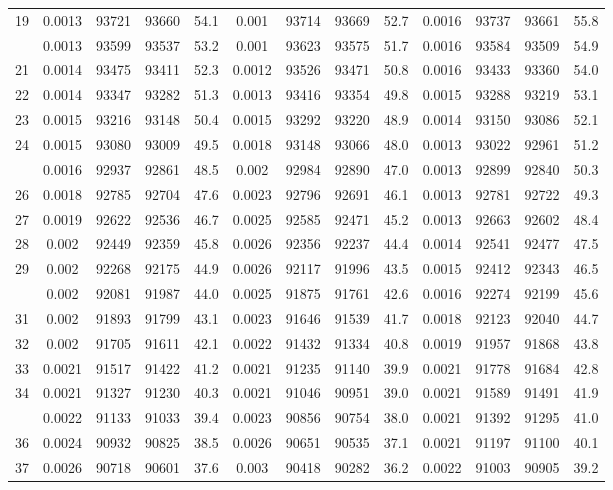 \documentclass[
  14pt,
]{article}
\begin{document}
\begin{longtable}[t]{lcccccccccccc}
19 & 0.0013 & 93721 & 93660 & 54.1 & 0.001 & 93714 & 93669 & 52.7 & 0.0016 & 93737 & 93661 & 55.8\\
\addlinespace
20 & 0.0013 & 93599 & 93537 & 53.2 & 0.001 & 93623 & 93575 & 51.7 & 0.0016 & 93584 & 93509 & 54.9\\
21 & 0.0014 & 93475 & 93411 & 52.3 & 0.0012 & 93526 & 93471 & 50.8 & 0.0016 & 93433 & 93360 & 54.0\\
22 & 0.0014 & 93347 & 93282 & 51.3 & 0.0013 & 93416 & 93354 & 49.8 & 0.0015 & 93288 & 93219 & 53.1\\
23 & 0.0015 & 93216 & 93148 & 50.4 & 0.0015 & 93292 & 93220 & 48.9 & 0.0014 & 93150 & 93086 & 52.1\\
24 & 0.0015 & 93080 & 93009 & 49.5 & 0.0018 & 93148 & 93066 & 48.0 & 0.0013 & 93022 & 92961 & 51.2\\
\addlinespace
25 & 0.0016 & 92937 & 92861 & 48.5 & 0.002 & 92984 & 92890 & 47.0 & 0.0013 & 92899 & 92840 & 50.3\\
26 & 0.0018 & 92785 & 92704 & 47.6 & 0.0023 & 92796 & 92691 & 46.1 & 0.0013 & 92781 & 92722 & 49.3\\
27 & 0.0019 & 92622 & 92536 & 46.7 & 0.0025 & 92585 & 92471 & 45.2 & 0.0013 & 92663 & 92602 & 48.4\\
28 & 0.002 & 92449 & 92359 & 45.8 & 0.0026 & 92356 & 92237 & 44.4 & 0.0014 & 92541 & 92477 & 47.5\\
29 & 0.002 & 92268 & 92175 & 44.9 & 0.0026 & 92117 & 91996 & 43.5 & 0.0015 & 92412 & 92343 & 46.5\\
\addlinespace
30 & 0.002 & 92081 & 91987 & 44.0 & 0.0025 & 91875 & 91761 & 42.6 & 0.0016 & 92274 & 92199 & 45.6\\
31 & 0.002 & 91893 & 91799 & 43.1 & 0.0023 & 91646 & 91539 & 41.7 & 0.0018 & 92123 & 92040 & 44.7\\
32 & 0.002 & 91705 & 91611 & 42.1 & 0.0022 & 91432 & 91334 & 40.8 & 0.0019 & 91957 & 91868 & 43.8\\
33 & 0.0021 & 91517 & 91422 & 41.2 & 0.0021 & 91235 & 91140 & 39.9 & 0.0021 & 91778 & 91684 & 42.8\\
34 & 0.0021 & 91327 & 91230 & 40.3 & 0.0021 & 91046 & 90951 & 39.0 & 0.0021 & 91589 & 91491 & 41.9\\
\addlinespace
35 & 0.0022 & 91133 & 91033 & 39.4 & 0.0023 & 90856 & 90754 & 38.0 & 0.0021 & 91392 & 91295 & 41.0\\
36 & 0.0024 & 90932 & 90825 & 38.5 & 0.0026 & 90651 & 90535 & 37.1 & 0.0021 & 91197 & 91100 & 40.1\\
37 & 0.0026 & 90718 & 90601 & 37.6 & 0.003 & 90418 & 90282 & 36.2 & 0.0022 & 91003 & 90905 & 39.2\\

\end{longtable}
\end{document}
